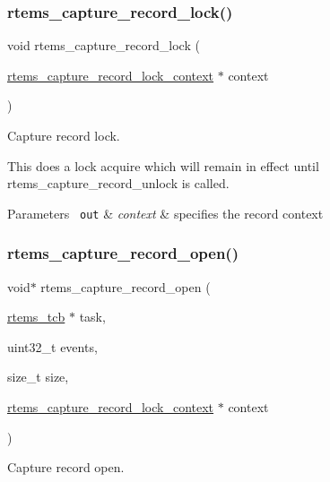 \subsubsection{\texorpdfstring{rtems\_capture\_record\_lock()}{rtems\_capture\_record\_lock()}}
{\footnotesize\ttfamily void rtems\+\_\+capture\+\_\+record\+\_\+lock (\begin{DoxyParamCaption}\item[{\mbox{\hyperlink{structrtems__capture__record__lock__context}{rtems\+\_\+capture\+\_\+record\+\_\+lock\+\_\+context}} $\ast$}]{context }\end{DoxyParamCaption})}



Capture record lock. 

This does a lock acquire which will remain in effect until rtems\+\_\+capture\+\_\+record\+\_\+unlock is called.


\begin{DoxyParams}[1]{Parameters}
\mbox{\texttt{ out}}  & {\em context} & specifies the record context \\
\hline
\end{DoxyParams}
\mbox{\label{group__libmisc__capture_gaf76eb4d9425d273c40b2b2209590583e}} 
\subsubsection{\texorpdfstring{rtems\_capture\_record\_open()}{rtems\_capture\_record\_open()}}
{\footnotesize\ttfamily void$\ast$ rtems\+\_\+capture\+\_\+record\+\_\+open (\begin{DoxyParamCaption}\item[{\mbox{\hyperlink{group__ClassicTasks_gadd9f38f296a7833767355b8236f68908}{rtems\+\_\+tcb}} $\ast$}]{task,  }\item[{uint32\+\_\+t}]{events,  }\item[{size\+\_\+t}]{size,  }\item[{\mbox{\hyperlink{structrtems__capture__record__lock__context}{rtems\+\_\+capture\+\_\+record\+\_\+lock\+\_\+context}} $\ast$}]{context }\end{DoxyParamCaption})}



Capture record open. 

